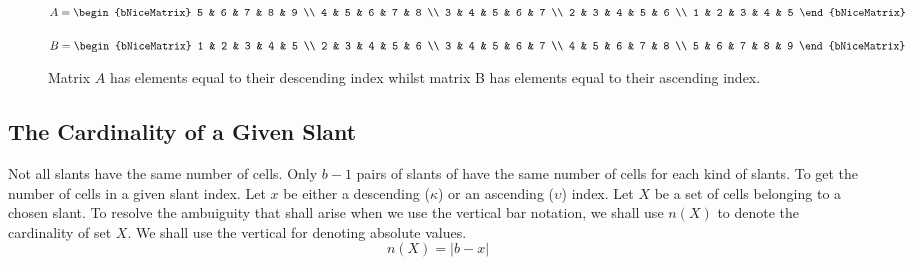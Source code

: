 \documentclass[letterpaper, twoside,12pt]{article}
\begin{document}
    \begin{figure}[ht]
        \centering
        \begin{minipage}{0.45\textwidth}
            \centering
            {$
            A =
            \begin{bNiceMatrix}
                5 & 6 & 7 & 8 & 9 \\
                4 & 5 & 6 & 7 & 8 \\
                3 & 4 & 5 & 6 & 7 \\
                2 & 3 & 4 & 5 & 6 \\
                1 & 2 & 3 & 4 & 5
            \end{bNiceMatrix}
            $}
        \end{minipage}
        \hfill
        \begin{minipage}{0.45\textwidth}
            \centering
            {$
            B =
            \begin{bNiceMatrix}
                1 & 2 & 3 & 4 & 5 \\
                2 & 3 & 4 & 5 & 6 \\
                3 & 4 & 5 & 6 & 7 \\
                4 & 5 & 6 & 7 & 8 \\
                5 & 6 & 7 & 8 & 9
            \end{bNiceMatrix}
            $}
        \end{minipage}
        \caption{Matrix $A$ has elements equal to their descending index whilst matrix B has elements equal to their ascending index.}
    \end{figure}

    \subsection{The Cardinality of a Given Slant} \label{slant_cardinality}
    Not all slants have the same number of cells. Only $b-1$ pairs of slants of have the same number of cells for each kind of slants. To get the number of cells in a given slant index. Let $x$ be either a descending ($\kappa$) or an ascending ($\upsilon$) index. Let $X$ be a set of cells belonging to a chosen slant. To resolve the ambuiguity that shall arise when we use the vertical bar notation, we shall use $n(X)$ to denote the cardinality of set $X$. We shall use the vertical for denoting absolute values.
    \begin{equation}
        n(X) = |b - x|
    \end{equation}
\end{document}
